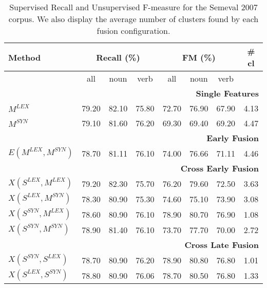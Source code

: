 \begin{table}[h!]
\centering
\setlength\tabcolsep{3pt}
\caption{Supervised Recall and Unsupervised F-measure for the Semeval 2007 corpus. We also display the average number of clusters found by each fusion configuration.}
\label{ref:wsd-semeval}
\begin{tabular}{@{}lccc|cccc@{}}
\toprule
\textbf{Method} & \multicolumn{3}{c|}{\textbf{Recall (\%)}} & \multicolumn{3}{c}{\textbf{FM (\%)}} & \# \textbf{cl} \\ \midrule
       & all           & noun          & verb          & all          & noun         & verb         &\\ 
       \midrule
       & \multicolumn{7}{r}{\textbf{Single Features}} \\ \midrule
       $M^{LEX}$                    & 79.20 & 82.10 & 75.80 &	72.70	 & 76.90 & 67.90 & 4.13\\
 

       $M^{SYN}$                    & 79.10 & 81.60 & 76.20 &	69.30	& 69.40 & 69.20 & 4.47\\
       \midrule
       &            \multicolumn{7}{r}{\textbf{Early Fusion}}       \\ \midrule
       $E(M^{LEX}, M^{SYN})$		& 78.70 & 81.11 & 76.10 &	74.00	& 76.66 & 71.11 & 4.46\\
	  \midrule
       &            \multicolumn{7}{r}{\textbf{Cross Early Fusion}}       \\ \midrule	         
	   
	   $X(S^{LEX}, M^{LEX})$		& 79.20 & 82.30 & 75.70 &	76.20	& 79.60 & 72.50 & 3.63 \\	   
       $X(S^{LEX}, M^{SYN})$		& 78.30 & 80.90 & 75.30 &	74.60	& 75.10 & 73.90 & 3.08 \\
	   $X(S^{SYN}, M^{LEX})$		& 78.60 & 80.90 & 76.10 &	78.90	& 80.70 & 76.90	 & 1.08 \\	   
       $X(S^{SYN}, M^{SYN})$		& 78.90 & 81.40 & 76.10 &	73.70	& 77.70 & 70.00 & 2.72 \\       
 \midrule
       &            \multicolumn{7}{r}{\textbf{Cross Late Fusion}}       \\ \midrule
	   
 
	   $X(S^{SYN}, S^{LEX})$		& 78.70 & 80.90 & 76.20 &	78.90	& 80.80 & 76.80 & 1.01 \\
	   $X(S^{LEX}, S^{SYN})$		& 78.80 & 80.90	& 76.06 &	78.70	& 80.50  & 76.80 & 1.33 \\
	  

\end{tabular}
\end{table}
